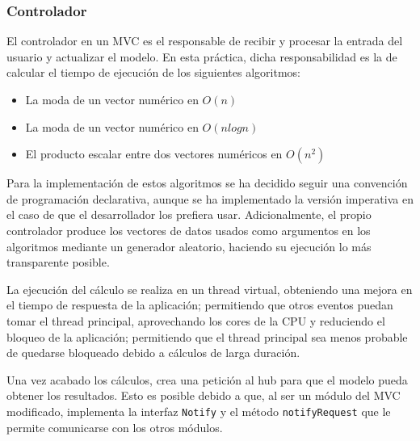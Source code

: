 \subsubsection{Controlador}
El controlador en un MVC es el responsable de recibir y procesar la entrada del usuario y actualizar el modelo. En esta práctica, dicha responsabilidad es la de calcular el tiempo de ejecución de los siguientes algoritmos:\medskip

\begin{itemize}[leftmargin=0pt]
    \item[] La moda de un vector numérico en $O(n)$
    \item[] La moda de un vector numérico en $O(n log n)$
    \item[] El producto escalar entre dos vectores numéricos en $O(n^2)$
\end{itemize}\medskip

Para la implementación de estos algoritmos se ha decidido seguir una convención de programación declarativa, aunque se ha implementado la versión imperativa en el caso de que el desarrollador los prefiera usar. Adicionalmente, el propio controlador produce los vectores de datos usados como argumentos en los algoritmos mediante un generador aleatorio, haciendo su ejecución lo más transparente posible.\bigskip

La ejecución del cálculo se realiza en un thread virtual, obteniendo una mejora en el tiempo de respuesta de la aplicación; permitiendo que otros eventos puedan tomar el thread principal, aprovechando los cores de la CPU y reduciendo el bloqueo de la aplicación; permitiendo que el thread principal sea menos probable de quedarse bloqueado debido a cálculos de larga duración.\bigskip

Una vez acabado los cálculos, crea una petición al hub para que el modelo pueda obtener los resultados. Esto es posible debido a que, al ser un módulo del MVC modificado, implementa la interfaz \texttt{Notify} y el método \texttt{notifyRequest} que le permite comunicarse con los otros módulos. 
